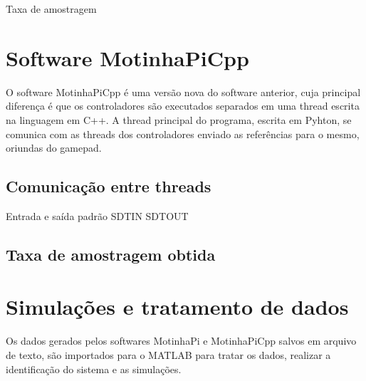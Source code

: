             Taxa de amostragem 
        
    \section{Software MotinhaPiCpp}
    
        O software MotinhaPiCpp é uma versão nova do software anterior, cuja principal diferença é que os controladores são executados separados em uma thread escrita na linguagem em C++. A thread principal do programa, escrita em Pyhton, se comunica com as threads dos controladores enviado as referências para o mesmo, oriundas do gamepad. 
        
        \subsection{Comunicação entre threads}
            Entrada e saída padrão SDTIN SDTOUT
        
        \subsection{Taxa de amostragem obtida}
            
        
    \section{Simulações e tratamento de dados}
        
        Os dados gerados pelos softwares MotinhaPi e MotinhaPiCpp salvos em arquivo de texto, são importados para o MATLAB para tratar os dados, realizar a identificação do sistema e as simulações.
        
